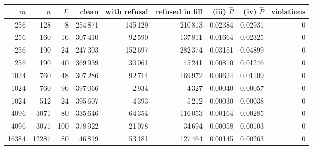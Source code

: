 \begin{tabular}{|r|r|r|r|r|r|r|r|r|}
\hline
$m$ & $n$ & $L$ & clean & with refusal & refused in fill & (iii) $\hat P$ & (iv) $\hat P$ & violations \\
\hline
256 & 128 & 8 & 254\,871 & 145\,129 & 210\,813 & 0.02384 & 0.02931 & 0 \\
256 & 160 & 16 & 307\,410 & 92\,590 & 137\,811 & 0.01664 & 0.02325 & 0 \\
256 & 190 & 24 & 247\,303 & 152\,697 & 282\,374 & 0.03151 & 0.04899 & 0 \\
256 & 190 & 40 & 369\,939 & 30\,061 & 45\,241 & 0.00810 & 0.01246 & 0 \\
1024 & 760 & 48 & 307\,286 & 92\,714 & 169\,972 & 0.00624 & 0.01109 & 0 \\
1024 & 760 & 96 & 397\,066 & 2\,934 & 4\,327 & 0.00040 & 0.00057 & 0 \\
1024 & 512 & 24 & 395\,607 & 4\,393 & 5\,212 & 0.00030 & 0.00038 & 0 \\
4096 & 3071 & 80 & 335\,646 & 64\,354 & 116\,053 & 0.00164 & 0.00285 & 0 \\
4096 & 3071 & 100 & 378\,922 & 21\,078 & 34\,694 & 0.00058 & 0.00103 & 0 \\
16384 & 12287 & 80 & 46\,819 & 53\,181 & 127\,464 & 0.00145 & 0.00263 & 0 \\
\hline
\end{tabular}
